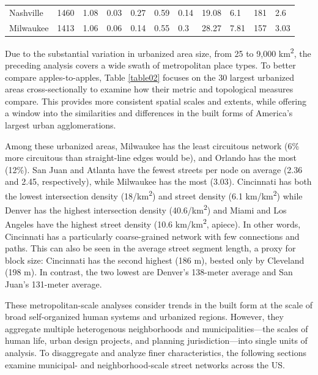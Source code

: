 \documentclass{article}
\begin{document}
\begin{landscape}
\begin{table}
\begin{tabular}{p{2.5cm} p{1.5cm} p{1.5cm} p{1.5cm} p{1.55cm} p{1.5cm} p{1.5cm} p{1.5cm} p{1.5cm} p{1.5cm} p{1.5cm}}
Nashville            & 1460          & 1.08         & 0.03                       & 0.27           & 0.59        & 0.14        & 19.08                 & 6.1                   & 181                   & 2.6              \\
Milwaukee            & 1413          & 1.06         & 0.06                       & 0.14           & 0.55        & 0.3         & 28.27                 & 7.81                  & 157                   & 3.03 \\
\bottomrule
\end{tabular}
\end{table}
\end{landscape}
\restoregeometry

Due to the substantial variation in urbanized area size, from 25 to 9,000 km\textsuperscript{2}, the preceding analysis covers a wide swath of metropolitan place types. To better compare apples-to-apples, Table \ref{table02} focuses on the 30 largest urbanized areas cross-sectionally to examine how their metric and topological measures compare. This provides more consistent spatial scales and extents, while offering a window into the similarities and differences in the built forms of America's largest urban agglomerations. 

Among these urbanized areas, Milwaukee has the least circuitous network (6\% more circuitous than straight-line edges would be), and Orlando has the most (12\%). San Juan and Atlanta have the fewest streets per node on average (2.36 and 2.45, respectively), while Milwaukee has the most (3.03). Cincinnati has both the lowest intersection density (18/km\textsuperscript{2}) and street density (6.1 km/km\textsuperscript{2}) while Denver has the highest intersection density (40.6/km\textsuperscript{2}) and Miami and Los Angeles have the highest street density (10.6 km/km\textsuperscript{2}, apiece). In other words, Cincinnati has a particularly coarse-grained network with few connections and paths. This can also be seen in the average street segment length, a proxy for block size: Cincinnati has the second highest (186 m), bested only by Cleveland (198 m). In contrast, the two lowest are Denver's 138-meter average and San Juan's 131-meter average.

These metropolitan-scale analyses consider trends in the built form at the scale of broad self-organized human systems and urbanized regions. However, they aggregate multiple heterogenous neighborhoods and municipalities---the scales of human life, urban design projects, and planning jurisdiction---into single units of analysis. To disaggregate and analyze finer characteristics, the following sections examine municipal- and neighborhood-scale street networks across the US.
\end{document}
